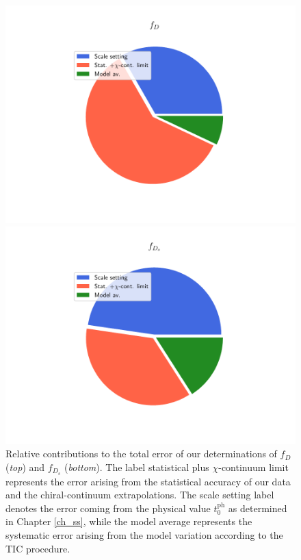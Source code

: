 \begin{figure}
\begin{center}
\begin{minipage}{.8\linewidth}
\includegraphics[width=\linewidth]{././cap6/figs/fds/error_pie_fd.pdf}
\end{minipage}
\hspace{10mm}
\begin{minipage}{.8\linewidth}
\includegraphics[width=\linewidth]{././cap6/figs/fds/error_pie_fds.pdf}
\end{minipage}
\end{center}
\vspace{-5mm}
	\caption{Relative contributions to the total error of our determinations of $f_D$ (\textit{top}) and $f_{D_s}$ (\textit{bottom}). The label statistical plus $\chi$-continuum limit represents the error arising from the statistical accuracy of our data and the chiral-continuum extrapolations. The scale setting label denotes the error coming from the physical value $t_0^{\mathrm{ph}}$ as determined in Chapter \ref{ch_ss}, while the model average represents the systematic error arising from the model variation according to the TIC procedure.	}
	\label{fig:fds_error_sources}
\end{figure}


